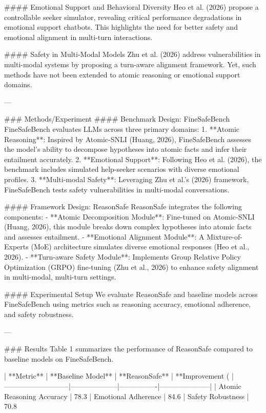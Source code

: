#### Emotional Support and Behavioral Diversity  
Heo et al. (2026) propose a controllable seeker simulator, revealing critical performance degradations in emotional support chatbots. This highlights the need for better safety and emotional alignment in multi-turn interactions.  

#### Safety in Multi-Modal Models  
Zhu et al. (2026) address vulnerabilities in multi-modal systems by proposing a turn-aware alignment framework. Yet, such methods have not been extended to atomic reasoning or emotional support domains.  

---

### Methods/Experiment  
#### Benchmark Design: FineSafeBench  
FineSafeBench evaluates LLMs across three primary domains:  
1. **Atomic Reasoning**: Inspired by Atomic-SNLI (Huang, 2026), FineSafeBench assesses the model's ability to decompose hypotheses into atomic facts and infer their entailment accurately.  
2. **Emotional Support**: Following Heo et al. (2026), the benchmark includes simulated help-seeker scenarios with diverse emotional profiles.  
3. **Multi-modal Safety**: Leveraging Zhu et al.'s (2026) framework, FineSafeBench tests safety vulnerabilities in multi-modal conversations.  

#### Framework Design: ReasonSafe  
ReasonSafe integrates the following components:  
- **Atomic Decomposition Module**: Fine-tuned on Atomic-SNLI (Huang, 2026), this module breaks down complex hypotheses into atomic facts and assesses entailment.  
- **Emotional Alignment Module**: A Mixture-of-Experts (MoE) architecture simulates diverse emotional responses (Heo et al., 2026).  
- **Turn-aware Safety Module**: Implements Group Relative Policy Optimization (GRPO) fine-tuning (Zhu et al., 2026) to enhance safety alignment in multi-modal, multi-turn settings.  

#### Experimental Setup  
We evaluate ReasonSafe and baseline models across FineSafeBench using metrics such as reasoning accuracy, emotional adherence, and safety robustness.  

---

### Results  
Table 1 summarizes the performance of ReasonSafe compared to baseline models on FineSafeBench.  

| **Metric**                | **Baseline Model** | **ReasonSafe** | **Improvement (%
|---------------------------|--------------------|----------------|---------------------|  
| Atomic Reasoning Accuracy | 78.3%
| Emotional Adherence       | 84.6%
| Safety Robustness         | 70.8%

